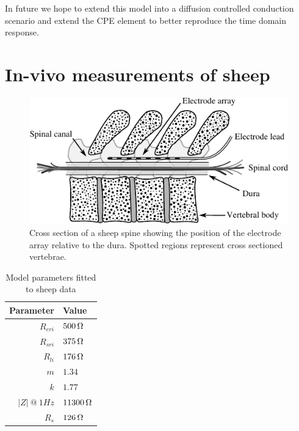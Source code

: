 \documentclass[journal, a4paper]{IEEEtran}
\begin{document}
In future we hope to extend this model into a diffusion controlled conduction scenario and extend the CPE element to better reproduce the time domain response.


\section{In-vivo measurements of sheep}
\label{sect:in-vivo}
\begin{figure}
    \begin{center}
        \includegraphics{graphics/sheepSpine}
    \end{center}
    \caption{Cross section of a sheep spine showing the position of the electrode array relative to the dura. Spotted regions represent cross sectioned vertebrae.}
    \label{fig:sheepSpine}
\end{figure}

\begin{table}
    \caption{Model parameters fitted to sheep data}
    \label{tab:sheepParameters}
    \begin{center}
        \begin{tabular}{r | l}
            Parameter & Value \\
            \hline
            $R_{eri}$ & $500\thinspace \Omega$\\
            $R_{sri}$ & $375\thinspace \Omega$\\
            $R_{li}$  & $176\thinspace \Omega$\\
            $m$       & $1.34$\\
            $k$       & $1.77$\\
            $|Z|\: @\: 1Hz$& $11300\thinspace \Omega$\\
            $R_{s}$   & $126\thinspace \Omega$
        \end{tabular}
    \end{center}
\end{table}
\end{document}
